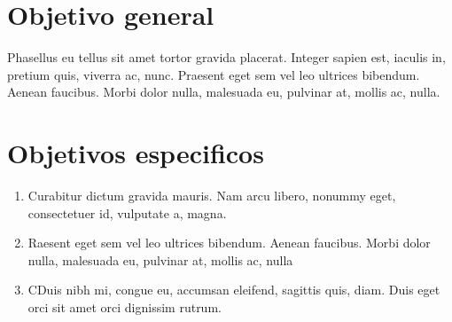 \section{Objetivo general}
    Phasellus eu tellus sit amet tortor gravida placerat. Integer sapien est, iaculis in, pretium quis, viverra ac, nunc. Praesent eget sem vel leo ultrices bibendum. Aenean faucibus. Morbi dolor nulla, malesuada eu, pulvinar at, mollis ac, nulla. 

\section{Objetivos especificos}
    \begin{enumerate}
        \item Curabitur dictum gravida mauris. Nam arcu libero, nonummy eget, consectetuer id, vulputate a, magna. 
        \item Raesent eget sem vel leo ultrices bibendum. Aenean faucibus. Morbi dolor nulla, malesuada eu, pulvinar at, mollis ac, nulla
        \item CDuis nibh mi, congue eu, accumsan eleifend, sagittis quis, diam. Duis eget orci sit amet orci dignissim rutrum.
    \end{enumerate}